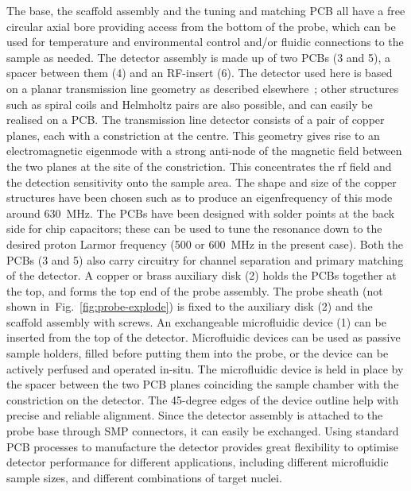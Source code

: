 \documentclass[preprint,5p]{elsarticle}
\newcommand{\fig}[1]{Fig.~\ref{#1}}
\begin{document}
The base, the scaffold assembly and the tuning and matching PCB all have a free circular 
axial bore providing access from the bottom of the probe, which can be used for 
temperature and environmental control and/or fluidic connections to the sample as
needed.
The detector assembly is made up of two PCBs (3 and 5), a spacer between them (4) and an 
RF-insert (6). The detector used here is based on a planar transmission line geometry 
as described elsewhere~\cite{gream_2016,stripline_jan}; other structures such as spiral
coils and Helmholtz pairs are also possible, and can easily be realised on a PCB.
The transmission line detector consists of a pair of copper 
planes, each with a constriction at the centre.  This geometry gives rise to an 
electromagnetic eigenmode with a strong anti-node of the magnetic field between
the two planes at the site of the constriction. This concentrates the rf field 
and the detection sensitivity
onto the sample area. 
The shape and size of the copper structures have been chosen such as to produce
an eigenfrequency of this mode around 630~MHz. The PCBs have been designed with
solder points at the back side for chip capacitors; these can be used to tune the
resonance down to the desired proton Larmor frequency (500 or 600~MHz in the present case).
Both the PCBs (3 and 5) also carry circuitry for channel separation and primary 
matching of the detector. A copper or brass auxiliary disk (2) holds the PCBs 
together at the top, and forms the top end of the probe assembly.
The probe sheath (not shown in~\fig{fig:probe-explode}) is fixed to the auxiliary disk (2) 
and the scaffold assembly with screws. 
An exchangeable microfluidic device (1) can be inserted from the top of the detector. 
Microfluidic devices can be used as passive sample holders, filled before putting them
into the probe,
or the device can be actively perfused and operated in-situ. 
The microfluidic device is held in place by the spacer 
between the two PCB planes coinciding the sample chamber with the constriction on the 
detector.  The 45-degree edges of the device outline help with precise and reliable
alignment. 
Since the detector assembly is attached to the probe base through SMP 
connectors, it can easily be exchanged. 
Using standard PCB processes to manufacture the detector provides great flexibility
to optimise detector performance for different applications, including different
microfluidic sample sizes, and different combinations of target nuclei.
\end{document}

